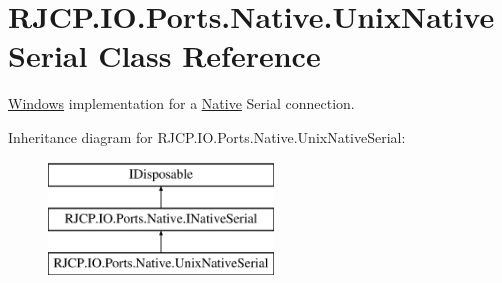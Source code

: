 \hypertarget{class_r_j_c_p_1_1_i_o_1_1_ports_1_1_native_1_1_unix_native_serial}{}\section{R\+J\+C\+P.\+I\+O.\+Ports.\+Native.\+Unix\+Native\+Serial Class Reference}
\label{class_r_j_c_p_1_1_i_o_1_1_ports_1_1_native_1_1_unix_native_serial}


\mbox{\hyperlink{namespace_r_j_c_p_1_1_i_o_1_1_ports_1_1_native_1_1_windows}{Windows}} implementation for a \mbox{\hyperlink{namespace_r_j_c_p_1_1_i_o_1_1_ports_1_1_native}{Native}} Serial connection.  


Inheritance diagram for R\+J\+C\+P.\+I\+O.\+Ports.\+Native.\+Unix\+Native\+Serial\+:\begin{figure}[H]
\begin{center}
\leavevmode
\includegraphics[height=3.000000cm]{class_r_j_c_p_1_1_i_o_1_1_ports_1_1_native_1_1_unix_native_serial}
\end{center}
\end{figure}
